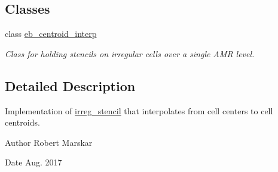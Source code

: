\subsection*{Classes}
\begin{DoxyCompactItemize}
\item 
class \hyperlink{classeb__centroid__interp}{eb\+\_\+centroid\+\_\+interp}
\begin{DoxyCompactList}\small\item\em Class for holding stencils on irregular cells over a single A\+MR level. \end{DoxyCompactList}\end{DoxyCompactItemize}


\subsection{Detailed Description}
Implementation of \hyperlink{classirreg__stencil}{irreg\+\_\+stencil} that interpolates from cell centers to cell centroids. 

\begin{DoxyAuthor}{Author}
Robert Marskar 
\end{DoxyAuthor}
\begin{DoxyDate}{Date}
Aug. 2017 
\end{DoxyDate}
